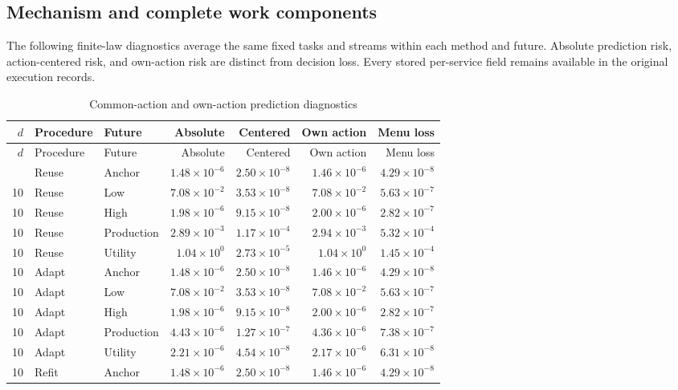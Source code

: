 \subsection{Mechanism and complete work components}
The following finite-law diagnostics average the same fixed tasks and streams within each method and future. Absolute prediction risk, action-centered risk, and own-action risk are distinct from decision loss. Every stored per-service field remains available in the original execution records.
\small\begin{longtable}{rllrrrr}
\caption{Common-action and own-action prediction diagnostics}\label{tab:r21risk}\\
\toprule $d$ & Procedure & Future & Absolute & Centered & Own action & Menu loss\\\midrule\endfirsthead
\toprule $d$ & Procedure & Future & Absolute & Centered & Own action & Menu loss\\\midrule\endhead
\bottomrule\endfoot
10 & Reuse & Anchor & $1.48\times10^{-6}$ & $2.50\times10^{-8}$ & $1.46\times10^{-6}$ & $4.29\times10^{-8}$\\
10 & Reuse & Low & $7.08\times10^{-2}$ & $3.53\times10^{-8}$ & $7.08\times10^{-2}$ & $5.63\times10^{-7}$\\
10 & Reuse & High & $1.98\times10^{-6}$ & $9.15\times10^{-8}$ & $2.00\times10^{-6}$ & $2.82\times10^{-7}$\\
10 & Reuse & Production & $2.89\times10^{-3}$ & $1.17\times10^{-4}$ & $2.94\times10^{-3}$ & $5.32\times10^{-4}$\\
10 & Reuse & Utility & $1.04\times10^{0}$ & $2.73\times10^{-5}$ & $1.04\times10^{0}$ & $1.45\times10^{-4}$\\
10 & Adapt & Anchor & $1.48\times10^{-6}$ & $2.50\times10^{-8}$ & $1.46\times10^{-6}$ & $4.29\times10^{-8}$\\
10 & Adapt & Low & $7.08\times10^{-2}$ & $3.53\times10^{-8}$ & $7.08\times10^{-2}$ & $5.63\times10^{-7}$\\
10 & Adapt & High & $1.98\times10^{-6}$ & $9.15\times10^{-8}$ & $2.00\times10^{-6}$ & $2.82\times10^{-7}$\\
10 & Adapt & Production & $4.43\times10^{-6}$ & $1.27\times10^{-7}$ & $4.36\times10^{-6}$ & $7.38\times10^{-7}$\\
10 & Adapt & Utility & $2.21\times10^{-6}$ & $4.54\times10^{-8}$ & $2.17\times10^{-6}$ & $6.31\times10^{-8}$\\
10 & Refit & Anchor & $1.48\times10^{-6}$ & $2.50\times10^{-8}$ & $1.46\times10^{-6}$ & $4.29\times10^{-8}$\\

\end{longtable}

